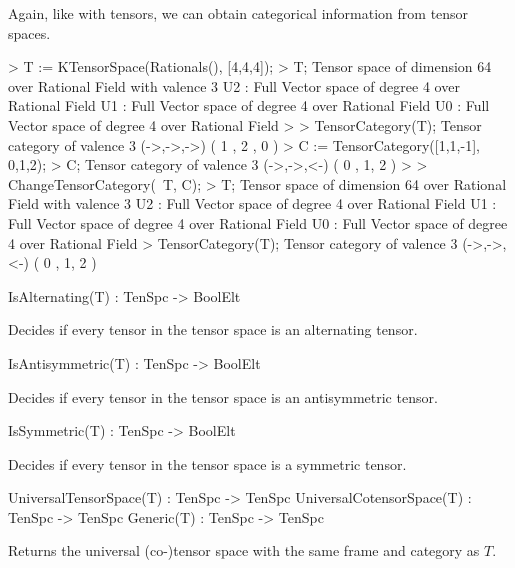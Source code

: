 \begin{example}[TenSpcCategories]

Again, like with tensors, we can obtain categorical information from tensor spaces.
\begin{code}
> T := KTensorSpace(Rationals(), [4,4,4]);
> T;
Tensor space of dimension 64 over Rational Field with valence 3
U2 : Full Vector space of degree 4 over Rational Field
U1 : Full Vector space of degree 4 over Rational Field
U0 : Full Vector space of degree 4 over Rational Field
> 
> TensorCategory(T);
Tensor category of valence 3 (->,->,->) ({ 1 },{ 2 },{ 0 })
> C := TensorCategory([1,1,-1], {{0},{1,2}});
> C;
Tensor category of valence 3 (->,->,<-) ({ 0 },{ 1, 2 })
> 
> ChangeTensorCategory(~T, C);
> T;
Tensor space of dimension 64 over Rational Field with valence 3
U2 : Full Vector space of degree 4 over Rational Field
U1 : Full Vector space of degree 4 over Rational Field
U0 : Full Vector space of degree 4 over Rational Field
> TensorCategory(T);
Tensor category of valence 3 (->,->,<-) ({ 0 },{ 1, 2 })
\end{code}
\end{example}


\begin{intrinsics}
IsAlternating(T) : TenSpc -> BoolElt
\end{intrinsics}

Decides if every tensor in the tensor space is an alternating tensor.

\begin{intrinsics}
IsAntisymmetric(T) : TenSpc -> BoolElt
\end{intrinsics}

Decides if every tensor in the tensor space is an antisymmetric tensor.

\begin{intrinsics}
IsSymmetric(T) : TenSpc -> BoolElt
\end{intrinsics}

Decides if every tensor in the tensor space is a symmetric tensor.

\begin{intrinsics}
UniversalTensorSpace(T) : TenSpc -> TenSpc
UniversalCotensorSpace(T) : TenSpc -> TenSpc
Generic(T) : TenSpc -> TenSpc
\end{intrinsics}

Returns the universal (co-)tensor space with the same frame and category as $T$.

